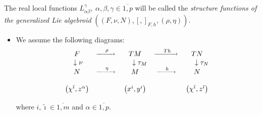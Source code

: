 \documentclass[11pt]{article}
\begin{document}
The real local functions $L_{\alpha \beta }^{\gamma },~\alpha ,\beta ,\gamma
\in \overline{1,p}$ will be called the \emph{structure functions of the
generalized Lie algebroid }$\left( \left( F,\nu ,N\right) ,\left[ ,\right]
_{F,h},\left( \rho ,\eta \right) \right) .$

\begin{itemize}
\item We assume the following diagrams:%
\begin{equation*}
\begin{array}[b]{ccccc}
F & ^{\underrightarrow{~\ \ \ \rho ~\ \ }} & TM & ^{\underrightarrow{~\ \ \
Th~\ \ }} & TN \\
~\downarrow \nu &  & ~\ \ \ \downarrow \tau _{M} &  & ~\ \ \ \downarrow \tau
_{N} \\
N & ^{\underrightarrow{~\ \ \ \eta ~\ \ }} & M & ^{\underrightarrow{~\ \ \
h~\ \ }} & N \\
&  &  &  &  \\
\left( \chi ^{\tilde{\imath}},z^{\alpha }\right) &  & \left(
x^{i},y^{i}\right) &  & \left( \chi ^{\tilde{\imath}},z^{\tilde{\imath}%
}\right)%
\end{array}%
\end{equation*}

where $i,\tilde{\imath}\in \overline{1,m}$ and $\alpha \in \overline{1,p}.$


\end{itemize}
\end{document}
